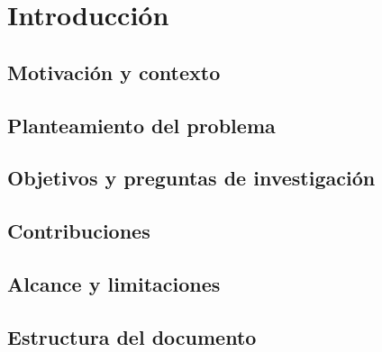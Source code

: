 \section{Introducción}\label{sec:intro}

\subsection{Motivación y contexto}\label{subsec:intro-motivacion}

\subsection{Planteamiento del problema}\label{subsec:intro-problema}

\subsection{Objetivos y preguntas de investigación}\label{subsec:intro-objetivos}

\subsection{Contribuciones}\label{subsec:intro-contribuciones}

\subsection{Alcance y limitaciones}\label{subsec:intro-alcance}

\subsection{Estructura del documento}\label{subsec:intro-estructura}
